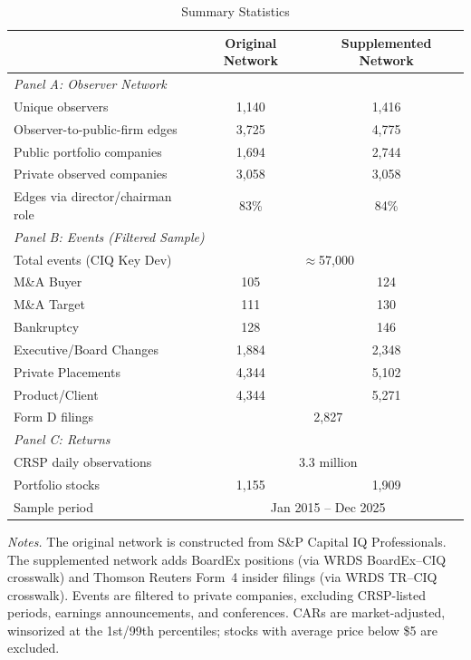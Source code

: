 \begin{table}[htbp]
\centering
\begin{threeparttable}
\caption{Summary Statistics}
\label{tab:summary}
\small
\begin{tabular}{lcc}
\toprule
 & Original Network & Supplemented Network \\
\midrule
\multicolumn{3}{l}{\textit{Panel A: Observer Network}} \\
\midrule
Unique observers & 1,140 & 1,416 \\
Observer-to-public-firm edges & 3,725 & 4,775 \\
Public portfolio companies & 1,694 & 2,744 \\
Private observed companies & 3,058 & 3,058 \\
Edges via director/chairman role & 83\% & 84\% \\
\midrule
\multicolumn{3}{l}{\textit{Panel B: Events (Filtered Sample)}} \\
\midrule
Total events (CIQ Key Dev) &  \multicolumn{2}{c}{$\approx$57,000} \\
\quad M\&A Buyer & 105 & 124 \\
\quad M\&A Target & 111 & 130 \\
\quad Bankruptcy & 128 & 146 \\
\quad Executive/Board Changes & 1,884 & 2,348 \\
\quad Private Placements & 4,344 & 5,102 \\
\quad Product/Client & 4,344 & 5,271 \\
Form D filings & \multicolumn{2}{c}{2,827} \\
\midrule
\multicolumn{3}{l}{\textit{Panel C: Returns}} \\
\midrule
CRSP daily observations & \multicolumn{2}{c}{3.3 million} \\
Portfolio stocks & 1,155 & 1,909 \\
Sample period & \multicolumn{2}{c}{Jan 2015 -- Dec 2025} \\
\bottomrule
\end{tabular}
\begin{tablenotes}
\footnotesize
\item \textit{Notes.} The original network is constructed from S\&P Capital IQ Professionals. The supplemented network adds BoardEx positions (via WRDS BoardEx--CIQ crosswalk) and Thomson Reuters Form~4 insider filings (via WRDS TR--CIQ crosswalk). Events are filtered to private companies, excluding CRSP-listed periods, earnings announcements, and conferences. CARs are market-adjusted, winsorized at the 1st/99th percentiles; stocks with average price below \$5 are excluded.
\end{tablenotes}
\end{threeparttable}
\end{table}
